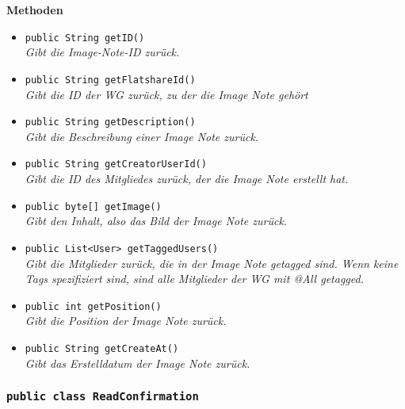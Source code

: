 	\textbf{Methoden}
	\begin{itemize}
		\item\texttt{{public String getID()}}\\
		\textit{Gibt die Image-Note-ID zurück.}\\
		
		\item\texttt{{public String getFlatshareId()}}\\
		\textit{Gibt die ID der WG zurück, zu der die Image Note gehört}\\
		
		\item\texttt{{public String getDescription()}}\\
		\textit{Gibt die Beschreibung einer Image Note zurück.}\\
		
		\item\texttt{{public String getCreatorUserId()}}\\
		\textit{Gibt die ID des Mitgliedes zurück, der die Image Note erstellt hat.}\\
		
		\item\texttt{{public byte[] getImage()}}\\
		\textit{Gibt den Inhalt, also das Bild der Image Note zurück.}\\
		
		\item\texttt{{public List<User> getTaggedUsers()}}\\
		\textit{Gibt die Mitglieder zurück, die in der Image Note getagged sind. Wenn keine Tags spezifiziert sind, sind alle Mitglieder der WG mit @All getagged.}\\
		
		\item\texttt{{public int getPosition()}}\\
		\textit{Gibt die Position der Image Note zurück.}\\
		
		\item\texttt{{public String getCreateAt()}}\\
		\textit{Gibt das Erstelldatum der Image Note zurück.}\\
	\end{itemize}

\subsubsection{\texttt{public class ReadConfirmation}}

